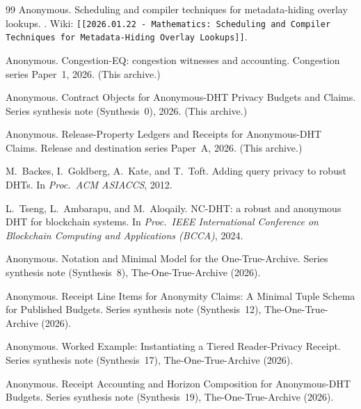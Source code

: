\documentclass[11pt]{article}
\begin{document}
\begin{thebibliography}{99}
Anonymous.
\newblock Scheduling and compiler techniques for metadata-hiding overlay lookups.
. Wiki: \texttt{[[2026.01.22 - Mathematics: Scheduling and Compiler Techniques for Metadata-Hiding Overlay Lookups]]}.

Anonymous.
\newblock Congestion-EQ: congestion witnesses and accounting.
\newblock Congestion series Paper~1, 2026. (This archive.)

Anonymous.
\newblock Contract Objects for Anonymous-DHT Privacy Budgets and Claims.
\newblock Series synthesis note (Synthesis~0), 2026. (This archive.)

Anonymous.
\newblock Release-Property Ledgers and Receipts for Anonymous-DHT Claims.
\newblock Release and destination series Paper~A, 2026. (This archive.)

M.~Backes, I.~Goldberg, A.~Kate, and T.~Toft.
\newblock Adding query privacy to robust DHTs.
\newblock In \emph{Proc.\ ACM ASIACCS}, 2012.

L.~Tseng, L.~Ambarapu, and M.~Aloqaily.
\newblock NC-DHT: a robust and anonymous DHT for blockchain systems.
\newblock In \emph{Proc.\ IEEE International Conference on Blockchain Computing and Applications (BCCA)}, 2024.


Anonymous.
\newblock Notation and Minimal Model for the One-True-Archive.
\newblock Series synthesis note (Synthesis~8), The-One-True-Archive (2026).

Anonymous.
\newblock Receipt Line Items for Anonymity Claims: A Minimal Tuple Schema for Published Budgets.
\newblock Series synthesis note (Synthesis~12), The-One-True-Archive (2026).

Anonymous.
\newblock Worked Example: Instantiating a Tiered Reader-Privacy Receipt.
\newblock Series synthesis note (Synthesis~17), The-One-True-Archive (2026).

Anonymous.
\newblock Receipt Accounting and Horizon Composition for Anonymous-DHT Budgets.
\newblock Series synthesis note (Synthesis~19), The-One-True-Archive (2026).

\end{thebibliography}
\end{document}
